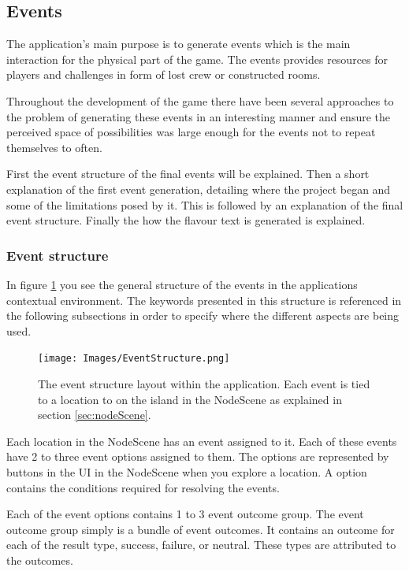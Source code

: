 \subsection{Events}
The application's main purpose is to generate events which is the main interaction for the physical part of the game. The events provides resources for players and challenges in form of lost crew or constructed rooms.

Throughout the development of the game there have been several approaches to the problem of generating these events in an interesting manner and ensure the perceived space of possibilities was large enough for the events not to repeat themselves to often.

First the event structure of the final events will be explained. Then a short explanation of the first event generation, detailing where the project began and some of the limitations posed by it. This is followed by an explanation of the final event structure. Finally the how the flavour text is generated is explained.

\subsubsection{Event structure}
In figure \ref{fig:eStruc} you see the general structure of the events in the applications contextual environment. The keywords presented in this structure is referenced in the following subsections in order to specify where the different aspects are being used.

\begin{figure}[h]
    \centering
    \texttt{[image: Images/EventStructure.png]}
    \caption{The event structure layout within the application. Each event is tied to a location to on the island in the NodeScene as explained in section \ref{sec:nodeScene}.}
    \label{fig:eStruc}
\end{figure}

Each location in the NodeScene has an event assigned to it. 
Each of these events have 2 to three event options assigned to them. The options are represented by buttons in the UI in the NodeScene when you explore a location. A option contains the conditions required for resolving the events. 

Each of the event options contains 1 to 3 event outcome group. The event outcome group simply is a bundle of event outcomes. It contains an outcome for each of the result type, success, failure, or neutral. These types are attributed to the outcomes.

